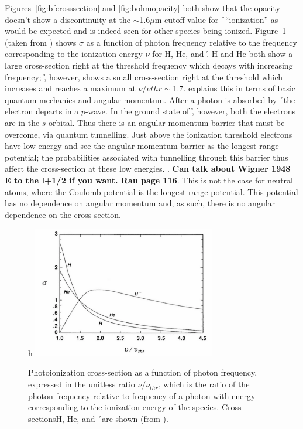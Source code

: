Figures~\ref{fig:bfcrosssection} and \ref{fig:bohmopacity} both show that the opacity doesn't show a discontinuity at the $\sim$1.6$\mu$m cutoff value for \h\ ``ionization'' as would be expected and is indeed seen for other species being ionized.  Figure~\ref{fig:bethe} (taken from \citealt{bethe1977}) shows $\sigma$ as a function of photon frequency relative to the frequency corresponding to the ionization energy $\nu$ for H, He, and \h.  H and He both show a large cross-section right at the threshold frequency which decays with increasing frequency; \h, however, shows a small cross-section right at the threshold which increases and reaches a maximum at $\nu/\nu{thr}\sim$1.7.  \cite{rau1996} explains this in terms of basic quantum mechanics and angular momentum.  After a photon is absorbed by \h\ the electron departs in a $p$-wave.  In the ground state of \h, however, both the electrons are in the $s$ orbital.  Thus there is an angular momentum barrier that must be overcome, via quantum tunnelling.  Just above the ionization threshold electrons have low energy and see the angular momentum barrier as the longest range potential; the probabilities associated with tunnelling through this barrier thus affect the cross-section at these low energies. .  {\bf Can talk about Wigner 1948 E to the l+1/2 if you want. Rau page 116}.  This is not the case for neutral atoms, where the Coulomb potential is the longest-range potential.  This potential has no dependence on angular momentum and, as such, there is no angular dependence on the cross-section.
\begin{figure}{h}
\includegraphics[width=80mm]{figs/betheplot.png}
\caption{\label{fig:bethe}Photoionization cross-section as a function of photon frequency, expressed in the unitless ratio $\nu/\nu_{thr}$, which is the ratio of the photon frequency relative to frequency of a photon with energy corresponding to the ionization energy of the species.  Cross-sectionsH, He, and \h\ are shown (from \citealt{bethe1977}).}
\end{figure}
